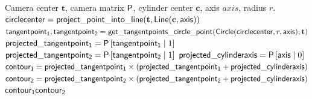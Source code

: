 \begin{algorithm} [H]
  \caption{Find lines in homogeneous coordinates from a cylinder and a camera}
  \label{alg:get_cylinder_contours}
\begin{algorithmic}[1]
\REQUIRE Camera center $\mathbf{t}$, camera matrix $\mathsf{P}$, cylinder center $\mathbf{c}$, axis $axis$, radius $r$. 
\STATE $\mathsf{circlecenter} = \mathsf{project\_point\_into\_line}(\mathbf{t}, \mathsf{Line}(\mathbf{c}, \mathsf{axis}))$
\STATE $\mathsf{tangentpoint_1}, \mathsf{tangentpoint_2} = \mathsf{get\_tangentpoints\_circle\_point}(
	\mathsf{Circle}(\mathsf{circlecenter}, r, \mathsf{axis}),
	\mathbf{t}
)$
\STATE $\mathsf{projected\_tangentpoint_1} = \mathsf{P} \left[\mathsf{tangentpoint_1} \;| \; 1\right]$
\STATE $\mathsf{projected\_tangentpoint_2} = \mathsf{P} \left[\mathsf{tangentpoint_2} \;| \; 1\right]$
\STATE $\mathsf{projected\_cylinderaxis} = \mathsf{P} \left[\mathsf{axis} \;| \; 0\right]$
\STATE $\mathsf{contour_1} = \mathsf{projected\_tangentpoint_1} \times ( \mathsf{projected\_tangentpoint_1} + \mathsf{projected\_cylinderaxis})$
\STATE $\mathsf{contour_2} = \mathsf{projected\_tangentpoint_2} \times ( \mathsf{projected\_tangentpoint_2} + \mathsf{projected\_cylinderaxis})$
\RETURN $\mathsf{contour_1} \mathsf{contour_2}$
\end{algorithmic}
\end{algorithm}

